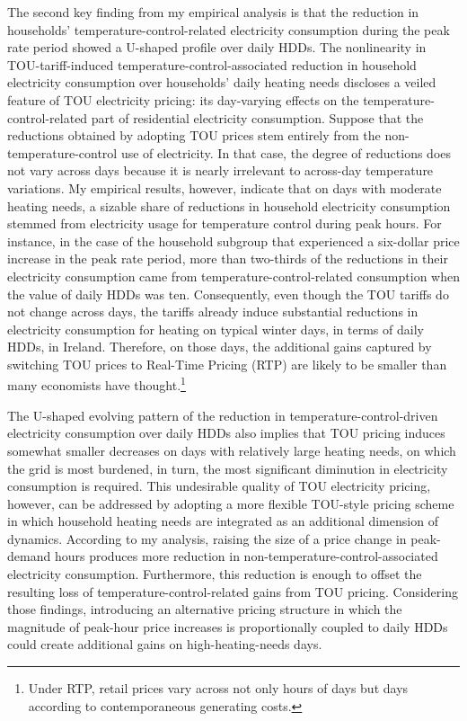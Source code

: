 The second key finding from my empirical analysis is that the reduction in households' temperature-control-related electricity consumption during the peak rate period showed a U-shaped profile over daily HDDs. The nonlinearity in TOU-tariff-induced temperature-control-associated reduction in household electricity consumption over households' daily heating needs discloses a veiled feature of TOU electricity pricing: its day-varying effects on the temperature-control-related part of residential electricity consumption. Suppose that the reductions obtained by adopting TOU prices stem entirely from the non-temperature-control use of electricity. In that case, the degree of reductions does not vary across days because it is nearly irrelevant to across-day temperature variations. My empirical results, however, indicate that on days with moderate heating needs, a sizable share of reductions in household electricity consumption stemmed from electricity usage for temperature control during peak hours. For instance, in the case of the household subgroup that experienced a six-dollar price increase in the peak rate period, more than two-thirds of the reductions in their electricity consumption came from temperature-control-related consumption when the value of daily HDDs was ten. Consequently, even though the TOU tariffs do not change across days, the tariffs already induce substantial reductions in electricity consumption for heating on typical winter days, in terms of daily HDDs, in Ireland. Therefore, on those days, the additional gains captured by switching TOU prices to Real-Time Pricing (RTP) are likely to be smaller than many economists have thought.\footnote{Under RTP, retail prices vary across not only hours of days but days according to contemporaneous generating costs.} 

The U-shaped evolving pattern of the reduction in temperature-control-driven electricity consumption over daily HDDs also implies that TOU pricing induces somewhat smaller decreases on days with relatively large heating needs, on which the grid is most burdened, in turn, the most significant diminution in electricity consumption is required. This undesirable quality of TOU electricity pricing, however, can be addressed by adopting a more flexible TOU-style pricing scheme in which household heating needs are integrated as an additional dimension of dynamics. According to my analysis, raising the size of a price change in peak-demand hours produces more reduction in non-temperature-control-associated electricity consumption. Furthermore, this reduction is enough to offset the resulting loss of temperature-control-related gains from TOU pricing. Considering those findings, introducing an alternative pricing structure in which the magnitude of peak-hour price increases is proportionally coupled to daily HDDs could create additional gains on high-heating-needs days. 

